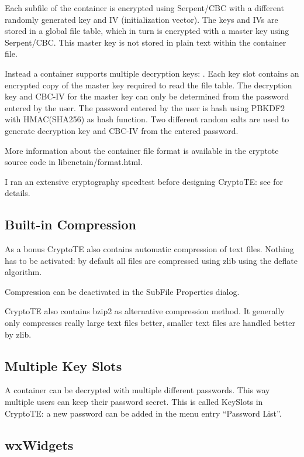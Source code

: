 \documentclass[a4paper,12pt,twoside]{article}
\begin{document}
Each subfile of the container is encrypted using Serpent/CBC with a different randomly generated key and IV (initialization vector). The keys and IVs are stored in a global file table, which in turn is encrypted with a master key using Serpent/CBC. This master key is not stored in plain text within the container file.

Instead a container supports multiple decryption keys: . Each key slot contains an encrypted copy of the master key required to read the file table. The decryption key and CBC-IV for the master key can only be determined from the password entered by the user. The password entered by the user is hash using PBKDF2 with HMAC(SHA256) as hash function. Two different random salts are used to generate decryption key and CBC-IV from the entered password.

More information about the container file format is available in the cryptote source code in libenctain/format.html.

I ran an extensive cryptography speedtest before designing CryptoTE: see  for details.

\subsection{Built-in Compression}\label{Compression}

As a bonus CryptoTE also contains automatic compression of text files. Nothing has to be activated: by default all files are compressed using zlib using the deflate algorithm.

Compression can be deactivated in the SubFile Properties dialog.

CryptoTE also contains bzip2 as alternative compression method. It generally only compresses really large text files better, smaller text files are handled better by zlib.

\subsection{Multiple Key Slots}\label{KeySlots}

A container can be decrypted with multiple different passwords. This way multiple users can keep their password secret. This is called KeySlots in CryptoTE: a new password can be added in the menu entry ``Password List''.

\subsection{wxWidgets}\label{wxWidgets}
\end{document}
